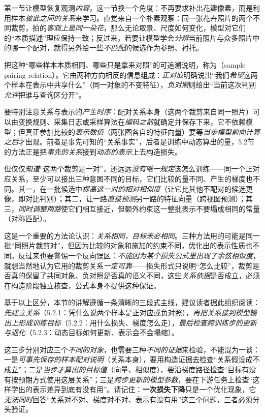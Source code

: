 第一节让模型恢复观测\emph{内容}，这一节换一个角度：不再要求补出花瓣像素，而是利用样本\emph{彼此之间的关系}来学习。直觉来自一个朴素观察：同一张花卉照片的两个不同裁剪，拍的\emph{客观上是同一朵花}，那么无论取景、尺度如何变化，模型对它们的“本质描述”理应保持一致；反过来，若要让模型学会\emph{分辨}当前照片与众多照片中的哪一个配对，就得另外给一些\emph{不匹配}的候选作为参照、衬托。

把这种“哪些样本本质相同、哪些只是拿来对照”的可追溯说明，称为（sample pairing relation）。它由两种方向相反的信息组成：\emph{正对应}明确说出“我们\emph{希望}这两个样本在表示中共享什么”（同一对象的不变特征），\emph{负对照}则给出“当前这次判别\emph{允许}把谁与查询区分开”。

要特别注意关系与表示的\emph{产生时序}：配对关系本身（这两个裁剪来自同一照片）可以由变换规则、采集日志或采样算法在\emph{编码之前}就确定并保存下来，它不依赖模型；但真正参加比较的\emph{表示数值}（两张图各自的特征向量）要等\emph{当步模型前向计算之后}才出现。前者是事先可知的“关系事实”，后者是训练中动态算出的量，5.2节的方法正是把\emph{事先的关系}接到\emph{动态的表示}上去构造损失。

但仅仅\emph{知道}“这两个裁剪是一对”，还远远\emph{没有唯一规定}该怎么训练——同一个正对应关系，至少可以接出三种意图不同的目标，它们比较的量不同、产生的梯度也不同。其一，在一批候选中\emph{提高这一对的相对相似度}（让它比其他不配对的候选更像，即对比判别）；其二，让一路\emph{直接预测}另一路的特征向量（跨视图预测）；其三，\emph{同时调整两路}使它们相互接近，但额外约束这一整批表示不要塌成相同的常量（对称匹配）。

这是一个重要的方法论认识：\emph{关系相同，目标未必相同}。三种方法用的可能是同一批“同照片裁剪对”，但因为比较的对象和施加的约束不同，优化出的表示性质也不同。反过来也要警惕一个反向误区：\emph{不能因为某个损失公式里出现了余弦相似度}，就想当然地认为它用的裁剪关系\emph{一定可靠}——损失形式只说明“怎么比较”，裁剪是否真的保留了共同对象、负对照是否真的语义不同，这些\emph{关系依据}是否成立，必须在构造阶段独立核查，公式本身不提供这种保证。

基于以上区分，本节的讲解遵循一条清晰的三段式主线，建议读者据此组织阅读：\emph{先建立关系}（5.2.1：凭什么说两个样本是正对应或负对照），\emph{再把关系接到模型输出上形成训练目标}（5.2.2：用什么损失、梯度怎么走），\emph{最后检查跨训练步的更新与退化}（5.2.3：动态目标如何更新、表示会不会塌缩）。

这三步分别对应三个\emph{不同的对象}，也需要三种\emph{不同的证据}来检验，不能混为一谈：一是\emph{可事先保存的样本配对说明}（关系本身），要用构造证据去检查“关系假设成不成立”；二是\emph{当步才算出的目标值}（向量、相似度），要沿梯度路径检查“目标有没有按预期方式使用这层关系”；三是\emph{跨步更新的模型参数}，要在下游任务上检查“这样学出的表示差异到底有没有用”。请记住：\textbf{一次损失下降}只是一个优化现象，它\emph{无法同时}回答“关系对不对、梯度对不对、表示有没有用”这三个问题，三者必须分头验证。

